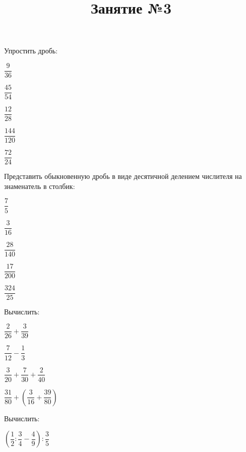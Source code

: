 %	
%
\title{Занятие №3}
\begin{listofex}
		\item Упростить дробь:
	\begin{enumcols}[itemcolumns=5]
		\item \( \dfrac{9}{36} \)
		\item \( \dfrac{45}{54} \)
		\item \( \dfrac{12}{28} \)
		\item \( \dfrac{144}{120} \)
		\item \( \dfrac{72}{24} \)
	\end{enumcols}
	\item Представить обыкновенную дробь в виде десятичной делением числителя на знаменатель в столбик:
	\begin{enumcols}[itemcolumns=5]
		\item \( \dfrac{7}{5} \)
		\item \( \dfrac{3}{16} \)
		\item \( \dfrac{28}{140} \)
		\item \( \dfrac{17}{200} \)
		\item \( \dfrac{324}{25} \)
	\end{enumcols}
	\item Вычислить:
	\begin{enumcols}[itemcolumns=4]
		\item \( \dfrac{2}{26}+\dfrac{3}{39} \)
		\item \( \dfrac{7}{12}-\dfrac{1}{3} \)
		\item \( \dfrac{3}{20}+\dfrac{7}{30}+\dfrac{2}{40} \)
		\item \( \dfrac{31}{80}+\left( \dfrac{3}{16}+\dfrac{39}{80} \right) \)
	\end{enumcols}
	\item Вычислить:
	\begin{enumcols}[itemcolumns=2]
		\item \( \left( \dfrac{1}{2}:\dfrac{3}{4}-\dfrac{4}{9} \right):\dfrac{3}{5} \)

\end{enumcols}
\end{listofex}
